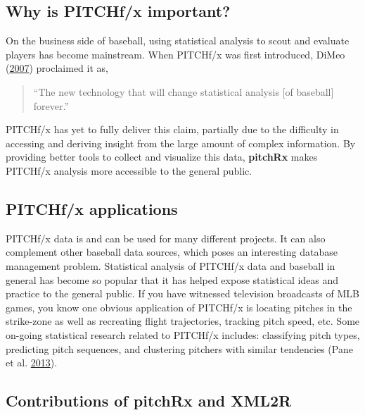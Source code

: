 \documentclass[12pt,]{isuthesis}
\begin{document}
\subsection{Why is PITCHf/x important?}\label{why-is-pitchfx-important}

On the business side of baseball, using statistical analysis to scout
and evaluate players has become mainstream. When PITCHf/x was first
introduced, DiMeo (\protect\hyperlink{ref-slate}{2007}) proclaimed it
as,

\begin{quote} ``The new technology that will change statistical analysis [of baseball] forever.'' \end{quote}

PITCHf/x has yet to fully deliver this claim, partially due to the
difficulty in accessing and deriving insight from the large amount of
complex information. By providing better tools to collect and visualize
this data, \textbf{pitchRx} makes PITCHf/x analysis more accessible to
the general public.

\subsection{PITCHf/x applications}\label{pitchfx-applications}

PITCHf/x data is and can be used for many different projects. It can
also complement other baseball data sources, which poses an interesting
database management problem. Statistical analysis of PITCHf/x data and
baseball in general has become so popular that it has helped expose
statistical ideas and practice to the general public. If you have
witnessed television broadcasts of MLB games, you know one obvious
application of PITCHf/x is locating pitches in the strike-zone as well
as recreating flight trajectories, tracking pitch speed, etc. Some
on-going statistical research related to PITCHf/x includes: classifying
pitch types, predicting pitch sequences, and clustering pitchers with
similar tendencies (Pane et al. \protect\hyperlink{ref-curve}{2013}).

\subsection[Contributions of pitchRx and XML2R]{Contributions of \textbf{pitchRx} and \textbf{XML2R}}
\end{document}
